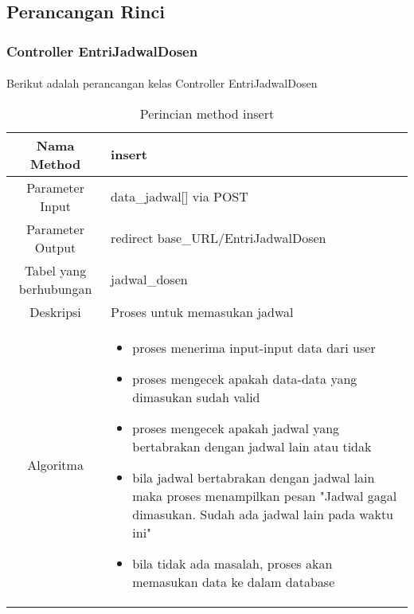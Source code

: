 \subsection{Perancangan Rinci}
\subsubsection{Controller EntriJadwalDosen}
\paragraph{} Berikut adalah perancangan kelas Controller EntriJadwalDosen \\
\begin{center}
	\begin{table}[H]
	\caption{Perincian method insert}
\begin{tabular}{|c|p{11cm}|}
\hline
Nama Method 	& 	insert 	\\
\hline
Parameter Input & data\_jadwal[] via POST \\
\hline
Parameter Output & redirect base\_URL/EntriJadwalDosen\\
\hline
Tabel yang berhubungan & jadwal\_dosen \\
\hline
Deskripsi	& Proses untuk memasukan jadwal \\
\hline
Algoritma	& \begin{itemize}
				\item proses menerima input-input data dari user
				\item proses mengecek apakah data-data yang dimasukan sudah valid
				\item proses mengecek apakah jadwal yang bertabrakan dengan jadwal lain atau tidak
				\item bila jadwal bertabrakan dengan jadwal lain maka proses menampilkan pesan "Jadwal gagal dimasukan. Sudah ada jadwal lain pada waktu ini"
				\item bila tidak ada masalah, proses akan memasukan data ke dalam database
				\end{itemize} \\
\hline
\end{tabular}
\end{table}
\end{center}

